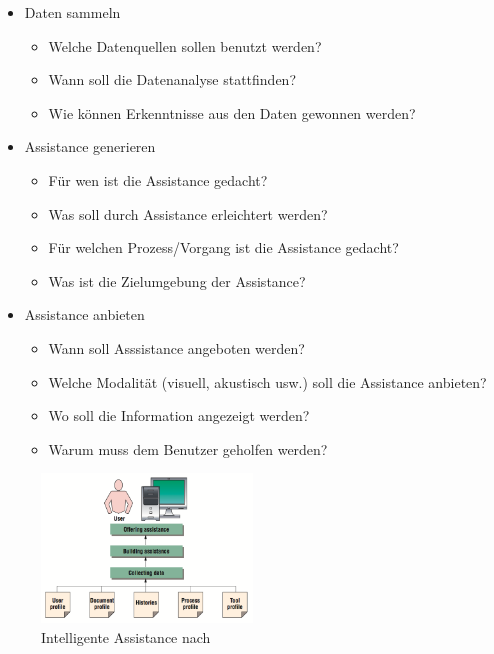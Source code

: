 \documentclass[
	headsepline,
	footsepline,
	fontsize=12pt,
	bibliography=totoc
]{scrbook}
\begin{document}
\begin{itemize}

	\item Daten sammeln
	\begin{itemize}
		\item Welche Datenquellen sollen benutzt werden?
		\item Wann soll die Datenanalyse stattfinden?
		\item Wie können Erkenntnisse aus den Daten gewonnen werden?
	\end{itemize}
	\item Assistance generieren
	\begin{itemize}
		\item Für wen ist die Assistance gedacht?
		\item Was soll durch Assistance erleichtert werden?
		\item Für welchen Prozess/Vorgang ist die Assistance gedacht?
		\item Was ist die Zielumgebung der Assistance?
	\end{itemize}
	\item Assistance anbieten
	\begin{itemize}
		\item Wann soll Asssistance angeboten werden?
		\item Welche Modalität (visuell, akustisch usw.) soll die Assistance anbieten?
		\item Wo soll die Information angezeigt werden?
		\item Warum muss dem Benutzer geholfen werden?
	\end{itemize}
\end{itemize}

\begin{figure}[htbp]
   \centering
   \includegraphics[width=0.5\textwidth]{images/grundlagen-intelligent_assistance.png}
   \caption{Intelligente Assistance nach \cite{Rech2007}}
   \label{figure:intelligent_assistance}
\end{figure}
\end{document}
